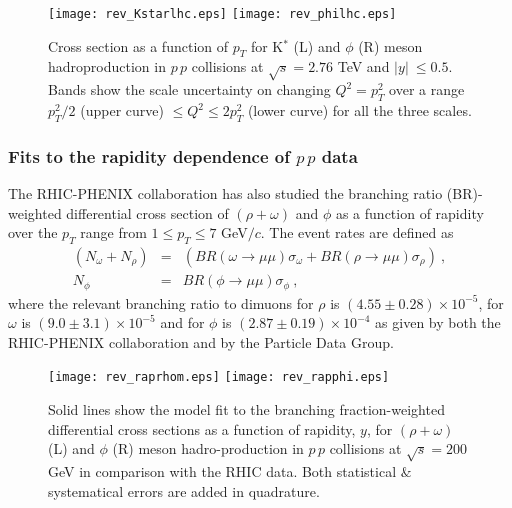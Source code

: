 \documentclass{ws-ijmpa}
\def\om{{\omega}}
\begin{document}
\begin{figure}[htp]
\texttt{[image: rev\_Kstarlhc.eps]}
\texttt{[image: rev\_philhc.eps]}
\vspace*{8pt}
\caption{Cross section as a function of $p_T$ for K$^*$ (L) and $\phi$
(R) meson hadroproduction in $p\,p$ collisions at $\sqrt{s} =2.76$ TeV and
$\vert y\vert \ \le 0.5$. Bands show the scale uncertainty on changing
$Q^2=p_T^2$ over a range $p_T^2/2$ (upper curve) $\le Q^2 \le 2 p_T^2$
(lower curve) for all the three scales.}
\label{fig:lhcband}
\end{figure}


\subsubsection{Fits to the rapidity dependence of $p\,p$ data}
\label{sssec:num3}

The RHIC-PHENIX collaboration has also studied\cite{Ratio} the branching
ratio (BR)- weighted differential cross section of $(\rho+\om)$ and
$\phi$ as a function of rapidity over the $p_T$ range from $1 \le p_T
\le 7$ GeV$/c$. The event rates are defined as
\begin{eqnarray} \nonumber
(N_{\om}+ N_{\rho}) & = & \left(BR(\om\rightarrow \mu\mu)\sigma_{\om} +
 BR(\rho\rightarrow \mu\mu)\sigma_{\rho}\right)~, \\
N_\phi & = & BR(\phi\rightarrow \mu\mu)\sigma_{\phi}~, \nonumber
\end{eqnarray}
where the relevant branching ratio to dimuons for $\rho$ is $(4.55\pm0.28)
\times 10^{-5}$, for $\om$ is $(9.0\pm3.1)\times 10^{-5}$ and for $\phi$
is $(2.87\pm 0.19) \times 10^{-4}$ as given by both
the RHIC-PHENIX collaboration\cite{Ratio} and by the Particle Data Group\cite{PDG}.

\begin{figure}[hpt]
\texttt{[image: rev\_raprhom.eps]}
\texttt{[image: rev\_rapphi.eps]}
\vspace*{8pt}
\caption{Solid lines show the model fit to the branching fraction-weighted
differential cross sections as a function of rapidity, $y$, for
$(\rho+\omega)$ (L) and $\phi$ (R) meson hadro-production in $p\,p$
collisions at $\sqrt{s} = 200$ GeV in comparison with the RHIC data. Both
statistical $\&$ systematical errors are added in quadrature.}
\label{fig:rapidity}
\end{figure}
\end{document}
